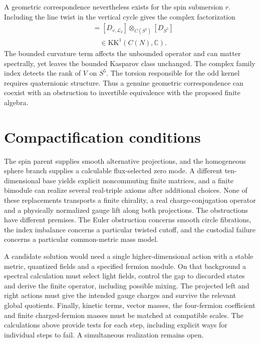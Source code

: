 \documentclass[11pt,oneside]{article}
\newcommand{\C}{\mathbb C}
\newcommand{\KK}{\mathrm{KK}}
\begin{document}
A geometric correspondence nevertheless exists for the spin submersion \(r\). Including the line twist in the vertical cycle gives the complex factorization \cite{kaad}
\begin{align*}
 [D_{N,\mathcal L_2}]&=[D_{v,\mathcal L_2}]
    \otimes_{C(S^5)}[D_{S^5}]\\
 &\hspace{1em}\in\KK^1(C(N),\C).
\end{align*}
The bounded curvature term affects the unbounded operator and can matter spectrally, yet leaves the bounded Kasparov class unchanged. The complex family index detects the rank of \(V\) on \(S^5\). The torsion responsible for the odd kernel requires quaternionic structure. Thus a genuine geometric correspondence can coexist with an obstruction to invertible equivalence with the proposed finite algebra.

\section{Compactification conditions}
The spin parent supplies smooth alternative projections, and the homogeneous sphere branch supplies a calculable flux-selected zero mode. A different ten-dimensional base yields explicit noncommuting finite matrices, and a finite bimodule can realize several real-triple axioms after additional choices. None of these replacements transports a finite chirality, a real charge-conjugation operator and a physically normalized gauge lift along both projections. The obstructions have different premises. The Euler obstruction concerns smooth circle fibrations, the index imbalance concerns a particular twisted cutoff, and the custodial failure concerns a particular common-metric mass model.

A candidate solution would need a single higher-dimensional action with a stable metric, quantized fields and a specified fermion module. On that background a spectral calculation must select light fields, control the gap to discarded states and derive the finite operator, including possible mixing. The projected left and right actions must give the intended gauge charges and survive the relevant global quotients. Finally, kinetic terms, vector masses, the four-fermion coefficient and finite charged-fermion masses must be matched at compatible scales. The calculations above provide tests for each step, including explicit ways for individual steps to fail. A simultaneous realization remains open.
\end{document}

